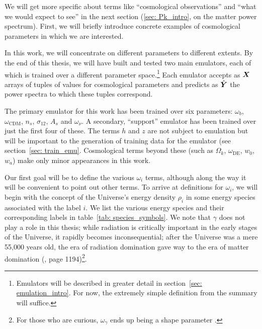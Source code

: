 We will get more specific about terms like ``cosmological observations''
and ``what we would expect to see'' in the next section (\ref{sec: Pk_intro}, 
on the matter power spectrum). First, we will briefly introduce concrete
examples of cosmological parameters in which we are interested.

In this work, we will concentrate on different parameters to different 
extents. 
By the end of this thesis, we will have built and tested two main
emulators, each of which is trained over a different parameter
space.\footnote{Emulators will be described in greater detail in
section~\ref{sec: emulation_intro}. For now, the extremely simple definition 
from the summary will suffice.}
Each emulator accepts as $\bm{X}$ arrays of tuples of values for 
cosmological 
parameters and predicts as $\hat{\bm{Y}}$ the power spectra to which these
tuples correspond. 


\begin{comment}

\textcolor{orange}{This paragraph needs to be rewritten. It's way too messy
to talk about parameters in order of importance!}

\end{comment}

The primary emulator for this work has been trained over six parameters:
$\omega_b$, $\omega_\text{CDM}$, $n_s$, $\sigma_{12}$, $A_s$ and $\omega_\nu$.
A secondary, ``support'' emulator has been trained over just the first four of
these. The terms $h$ and $z$ are not subject to emulation but will be 
important to the generation of training data for the emulator (see 
section~\ref{sec: train_emu}. Cosmological terms beyond these (such as
$\Omega_k$, $\omega_\text{DE}$, $w_0$, $w_a$) make only minor appearances in 
this work.


Our first goal will be to define the various $\omega_i$ terms, although along
the way it will be convenient to point out other terms. To arrive at
definitions for $\omega_i$, we will begin with the concept of the Universe's 
energy density $\rho_i$
in some energy species associated with the label $i$. We list the various
energy species and their corresponding labels in
table~\ref{tab: species_symbols}.
We note that $\gamma$ does not play a role in this thesis;
while radiation is critically important in the early stages of the
Universe, it rapidly becomes inconsequential; after the Universe was a mere
55,000 years old, the
era of radiation domination gave way to the era of matter domination 
(, page 1194)\footnote{For those who are
curious, $\omega_\gamma$ ends up being a shape parameter .}.

